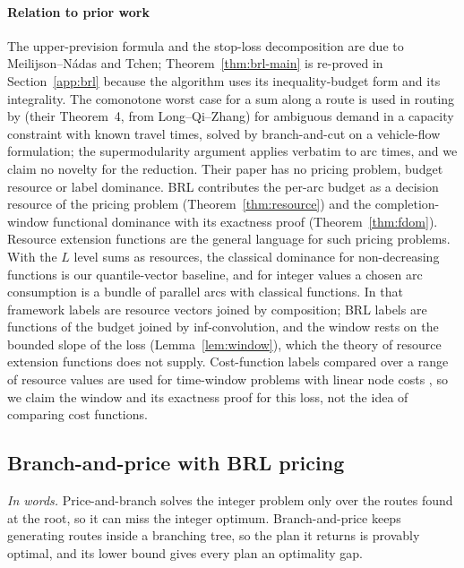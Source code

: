 \documentclass[preprint,11pt]{elsarticle}
\theoremstyle{definition}
\theoremstyle{remark}
\begin{document}
\paragraph{Relation to prior work} The upper-prevision formula and the stop-loss decomposition are due to Meilijson--N\'adas and Tchen; Theorem~\ref{thm:brl-main} is re-proved in Section~\ref{app:brl} because the algorithm uses its inequality-budget form and its integrality. The comonotone worst case for a sum along a route is used in routing by \citet{GhosalHoWiesemann2024} (their Theorem~4, from Long--Qi--Zhang) for ambiguous demand in a capacity constraint with known travel times, solved by branch-and-cut on a vehicle-flow formulation; the supermodularity argument applies verbatim to arc times, and we claim no novelty for the reduction. Their paper has no pricing problem, budget resource or label dominance. BRL contributes the per-arc budget as a decision resource of the pricing problem (Theorem~\ref{thm:resource}) and the completion-window functional dominance with its exactness proof (Theorem~\ref{thm:fdom}). Resource extension functions \citep{Irnich2008} are the general language for such pricing problems. With the $L$ level sums as resources, the classical dominance for non-decreasing functions is our quantile-vector baseline, and for integer values a chosen arc consumption is a bundle of parallel arcs with classical functions. In that framework labels are resource vectors joined by composition; BRL labels are functions of the budget joined by inf-convolution, and the window rests on the bounded slope of the loss (Lemma~\ref{lem:window}), which the theory of resource extension functions does not supply. Cost-function labels compared over a range of resource values are used for time-window problems with linear node costs \citep{Ioachim1998}, so we claim the window and its exactness proof for this loss, not the idea of comparing cost functions.

\subsection{Branch-and-price with BRL pricing}\label{sec:bp}

\emph{In words.} Price-and-branch solves the integer problem only over the routes found at the root, so it can miss the integer optimum. Branch-and-price keeps generating routes inside a branching tree, so the plan it returns is provably optimal, and its lower bound gives every plan an optimality gap.
\end{document}
